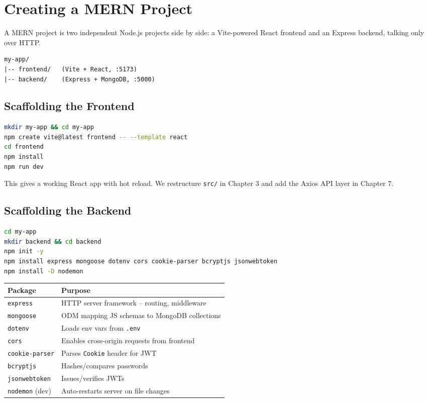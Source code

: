 \chapter{Creating a MERN Project}

A MERN project is two independent Node.js projects side by side: a
Vite-powered React frontend and an Express backend, talking only over HTTP.

\begin{diagrambox}
\begin{verbatim}
my-app/
|-- frontend/   (Vite + React, :5173)
|-- backend/    (Express + MongoDB, :5000)
\end{verbatim}
\end{diagrambox}

\section{Scaffolding the Frontend}

\begin{lstlisting}[language=bash]
mkdir my-app && cd my-app
npm create vite@latest frontend -- --template react
cd frontend
npm install
npm run dev
\end{lstlisting}

This gives a working React app with hot reload. We restructure \texttt{src/}
in Chapter 3 and add the Axios API layer in Chapter 7.

\section{Scaffolding the Backend}

\begin{lstlisting}[language=bash]
cd my-app
mkdir backend && cd backend
npm init -y
npm install express mongoose dotenv cors cookie-parser bcryptjs jsonwebtoken
npm install -D nodemon
\end{lstlisting}

\begin{table}[h]
\centering
\begin{tabularx}{\textwidth}{lX}
\toprule
\textbf{Package} & \textbf{Purpose} \\
\midrule
\texttt{express} & HTTP server framework -- routing, middleware \\
\texttt{mongoose} & ODM mapping JS schemas to MongoDB collections \\
\texttt{dotenv} & Loads env vars from \texttt{.env} \\
\texttt{cors} & Enables cross-origin requests from frontend \\
\texttt{cookie-parser} & Parses \texttt{Cookie} header for JWT \\
\texttt{bcryptjs} & Hashes/compares passwords \\
\texttt{jsonwebtoken} & Issues/verifies JWTs \\
\texttt{nodemon} (dev) & Auto-restarts server on file changes \\
\bottomrule
\end{tabularx}
\end{table}

